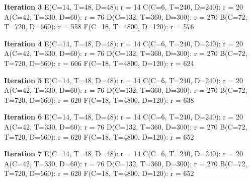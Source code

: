 \documentclass[]{report}
\begin{document}
			\textbf{Iteration 3} \newline
			E(C=14, T=48, D=48): r = 14 \newline
			C(C=6, T=240, D=240): r = 20 \newline
			A(C=42, T=330, D=60): r = 76 \newline
			D(C=132, T=360, D=300): r = 270 \newline
			B(C=72, T=720, D=660): r = 558 \newline
			F(C=18, T=4800, D=120): r = 576 \newline
	
			\textbf{Iteration 4} \newline
			E(C=14, T=48, D=48): r = 14 \newline
			C(C=6, T=240, D=240): r = 20 \newline
			A(C=42, T=330, D=60): r = 76 \newline
			D(C=132, T=360, D=300): r = 270 \newline
			B(C=72, T=720, D=660): r = 606 \newline
			F(C=18, T=4800, D=120): r = 624 \newline
	
			\textbf{Iteration 5} \newline
			E(C=14, T=48, D=48): r = 14 \newline
			C(C=6, T=240, D=240): r = 20 \newline
			A(C=42, T=330, D=60): r = 76 \newline
			D(C=132, T=360, D=300): r = 270 \newline
			B(C=72, T=720, D=660): r = 620 \newline
			F(C=18, T=4800, D=120): r = 638 \newline
	
			\textbf{Iteration 6} \newline
			E(C=14, T=48, D=48): r = 14 \newline
			C(C=6, T=240, D=240): r = 20 \newline
			A(C=42, T=330, D=60): r = 76 \newline
			D(C=132, T=360, D=300): r = 270 \newline
			B(C=72, T=720, D=660): r = 620 \newline
			F(C=18, T=4800, D=120): r = 652 \newline
	
			\textbf{Iteration 7} \newline
			E(C=14, T=48, D=48): r = 14 \newline
			C(C=6, T=240, D=240): r = 20 \newline
			A(C=42, T=330, D=60): r = 76 \newline
			D(C=132, T=360, D=300): r = 270 \newline
			B(C=72, T=720, D=660): r = 620 \newline
			F(C=18, T=4800, D=120): r = 652 \newline
			
\end{document}

